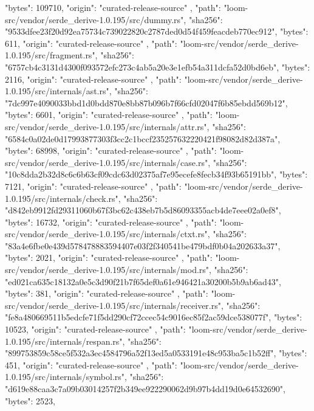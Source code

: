 {{      "bytes": 109710,
      "origin": "curated-release-source"
    },
    {
      "path": "loom-src/vendor/serde_derive-1.0.195/src/dummy.rs",
      "sha256": "9533dfee23f20d92ea75734c739022820c2787ded0d54f459feacdeb770ec912",
      "bytes": 611,
      "origin": "curated-release-source"
    },
    {
      "path": "loom-src/vendor/serde_derive-1.0.195/src/fragment.rs",
      "sha256": "6757cb4c3131d4300f093572efc273c4ab5a20e3e1efb54a311dcfa52d0bd6eb",
      "bytes": 2116,
      "origin": "curated-release-source"
    },
    {
      "path": "loom-src/vendor/serde_derive-1.0.195/src/internals/ast.rs",
      "sha256": "7dc997e4090033bbd1d0bdd870e8bb87b096b7f66cfd02047f6b85ebdd569b12",
      "bytes": 6601,
      "origin": "curated-release-source"
    },
    {
      "path": "loom-src/vendor/serde_derive-1.0.195/src/internals/attr.rs",
      "sha256": "6584c0a02de0d17993877303f3cc2c1bccf235257632220421f98082d82d387a",
      "bytes": 68998,
      "origin": "curated-release-source"
    },
    {
      "path": "loom-src/vendor/serde_derive-1.0.195/src/internals/case.rs",
      "sha256": "10c8dda2b32d8c6c6b63cf09cdc63d02375af7e95ecefe8fecb34f93b65191bb",
      "bytes": 7121,
      "origin": "curated-release-source"
    },
    {
      "path": "loom-src/vendor/serde_derive-1.0.195/src/internals/check.rs",
      "sha256": "d842eb9912fd29311060b67f3bc62c438eb7b5d86093355acb4de7eee02a0ef8",
      "bytes": 16732,
      "origin": "curated-release-source"
    },
    {
      "path": "loom-src/vendor/serde_derive-1.0.195/src/internals/ctxt.rs",
      "sha256": "83a4e6fbe0e439d578478883594407e03f2f340541be479bdf0b04a202633a37",
      "bytes": 2021,
      "origin": "curated-release-source"
    },
    {
      "path": "loom-src/vendor/serde_derive-1.0.195/src/internals/mod.rs",
      "sha256": "ed021ca635c18132a0e5c3d90f21b7f65def0a61e946421a30200b5b9ab6ad43",
      "bytes": 381,
      "origin": "curated-release-source"
    },
    {
      "path": "loom-src/vendor/serde_derive-1.0.195/src/internals/receiver.rs",
      "sha256": "fe8a480669511b5edcfe71f5dd290cf72ccec54c9016ec85f2ac59dce538077f",
      "bytes": 10523,
      "origin": "curated-release-source"
    },
    {
      "path": "loom-src/vendor/serde_derive-1.0.195/src/internals/respan.rs",
      "sha256": "899753859c58ce5f532a3ec4584796a52f13ed5a0533191e48c953ba5c1b52ff",
      "bytes": 451,
      "origin": "curated-release-source"
    },
    {
      "path": "loom-src/vendor/serde_derive-1.0.195/src/internals/symbol.rs",
      "sha256": "d619e88caa3c7a09b03014257f2b349ee922290062d9b97b4dd19d0e64532690",
      "bytes": 2523,
}}

